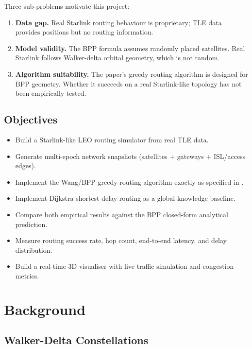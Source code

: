 \documentclass[12pt,a4paper]{report}
\begin{document}
Three sub-problems motivate this project:

\begin{enumerate}
  \item \textbf{Data gap.} Real Starlink routing behaviour is proprietary; TLE data
        provides positions but no routing information.
  \item \textbf{Model validity.} The BPP formula assumes randomly placed satellites.
        Real Starlink follows Walker-delta orbital geometry, which is not random.
  \item \textbf{Algorithm suitability.} The paper's greedy routing algorithm is
        designed for BPP geometry. Whether it succeeds on a real Starlink-like
        topology has not been empirically tested.
\end{enumerate}

\section{Objectives}

\begin{itemize}
  \item Build a Starlink-like LEO routing simulator from real TLE data.
  \item Generate multi-epoch network snapshots (satellites + gateways + ISL/access edges).
  \item Implement the Wang/BPP greedy routing algorithm exactly as specified in
        \cite{wang2023reliability}.
  \item Implement Dijkstra shortest-delay routing as a global-knowledge baseline.
  \item Compare both empirical results against the BPP closed-form analytical prediction.
  \item Measure routing success rate, hop count, end-to-end latency, and delay distribution.
  \item Build a real-time 3D visualiser with live traffic simulation and congestion metrics.
\end{itemize}

\chapter{Background}
\label{ch:background}

\section{Walker-Delta Constellations}
\end{document}
